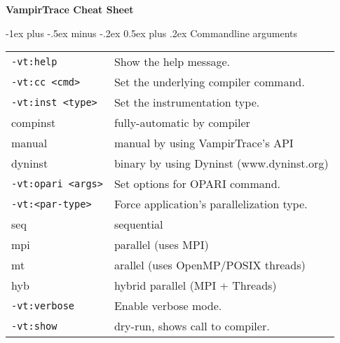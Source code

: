 \documentclass[letterpaper,10pt,landscape]{article}
\makeatletter
\renewcommand{\section}{\@startsection{section}{1}{0mm}%
                                {-1ex plus -.5ex minus -.2ex}%
                                {0.5ex plus .2ex}%
                                {\normalfont\large\bfseries}}
\makeatother
\begin{document}
\raggedright
\footnotesize
\begin{multicols}{3}


\setlength{\premulticols}{1pt}
\setlength{\postmulticols}{1pt}
\setlength{\multicolsep}{1pt}
\setlength{\columnsep}{2pt}

\begin{center}
     \Large{\textbf{VampirTrace Cheat Sheet}} \\
\end{center}

\section{Commandline arguments}
\begin{tabular}{@{}ll@{}}
\texttt{-vt:help}            & Show the help message.\\
\texttt{-vt:cc  <cmd>}       & Set the underlying compiler command.\\
\texttt{-vt:inst <type>}     & Set the instrumentation type.\\
\hspace{5ex} compinst          & fully-automatic by compiler\\
\hspace{5ex} manual            & manual by using VampirTrace's API\\
\hspace{5ex} dyninst           & binary by using Dyninst (www.dyninst.org) \\
\texttt{-vt:opari <args>}    & Set options for OPARI command.\\
\texttt{-vt:<par-type>}      & Force application's parallelization type.\\
\hspace{5ex} seq               & sequential\\
\hspace{5ex} mpi               & parallel (uses MPI)\\
\hspace{5ex} mt                & arallel (uses OpenMP/POSIX threads)\\
\hspace{5ex} hyb               & hybrid parallel (MPI + Threads)\\
\texttt{-vt:verbose}         & Enable verbose mode.\\
\texttt{-vt:show}            & dry-run, shows call to compiler.
\end{tabular}


\end{multicols}
\end{document}
